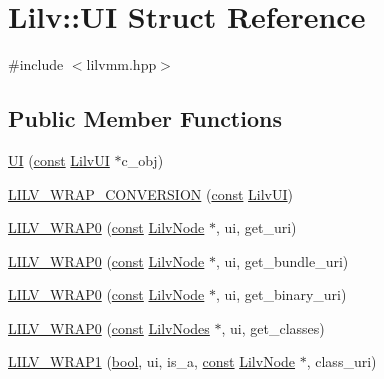 \hypertarget{struct_lilv_1_1_u_i}{}\section{Lilv\+:\+:UI Struct Reference}
\label{struct_lilv_1_1_u_i}


{\ttfamily \#include $<$lilvmm.\+hpp$>$}

\subsection*{Public Member Functions}
\begin{DoxyCompactItemize}
\item 
\hyperlink{struct_lilv_1_1_u_i_ad52e00fe47c440113b2fd5a8b11887aa}{UI} (\hyperlink{getopt1_8c_a2c212835823e3c54a8ab6d95c652660e}{const} \hyperlink{lilv_8h_a42d32f453a79ab1c944daa6436f22dde}{Lilv\+UI} $\ast$c\+\_\+obj)
\item 
\hyperlink{struct_lilv_1_1_u_i_a9a5ce875cb13a6f056c598b40f075cb8}{L\+I\+L\+V\+\_\+\+W\+R\+A\+P\+\_\+\+C\+O\+N\+V\+E\+R\+S\+I\+ON} (\hyperlink{getopt1_8c_a2c212835823e3c54a8ab6d95c652660e}{const} \hyperlink{lilv_8h_a42d32f453a79ab1c944daa6436f22dde}{Lilv\+UI})
\item 
\hyperlink{struct_lilv_1_1_u_i_a2447e863e3ed08a1f4e858b542fcc5d6}{L\+I\+L\+V\+\_\+\+W\+R\+A\+P0} (\hyperlink{getopt1_8c_a2c212835823e3c54a8ab6d95c652660e}{const} \hyperlink{lilv_8h_ae183dca3dca5368d34dbd863a405437b}{Lilv\+Node} $\ast$, ui, get\+\_\+uri)
\item 
\hyperlink{struct_lilv_1_1_u_i_a1482ca37df08c85de952f3f0aa1ab165}{L\+I\+L\+V\+\_\+\+W\+R\+A\+P0} (\hyperlink{getopt1_8c_a2c212835823e3c54a8ab6d95c652660e}{const} \hyperlink{lilv_8h_ae183dca3dca5368d34dbd863a405437b}{Lilv\+Node} $\ast$, ui, get\+\_\+bundle\+\_\+uri)
\item 
\hyperlink{struct_lilv_1_1_u_i_a7cc94ccd343041f3de1874c11a2951d0}{L\+I\+L\+V\+\_\+\+W\+R\+A\+P0} (\hyperlink{getopt1_8c_a2c212835823e3c54a8ab6d95c652660e}{const} \hyperlink{lilv_8h_ae183dca3dca5368d34dbd863a405437b}{Lilv\+Node} $\ast$, ui, get\+\_\+binary\+\_\+uri)
\item 
\hyperlink{struct_lilv_1_1_u_i_acb33c005aca29eab0d855a6ec74297ec}{L\+I\+L\+V\+\_\+\+W\+R\+A\+P0} (\hyperlink{getopt1_8c_a2c212835823e3c54a8ab6d95c652660e}{const} \hyperlink{lilv_8h_a256c2c4443307f320de24bb31198df83}{Lilv\+Nodes} $\ast$, ui, get\+\_\+classes)
\item 
\hyperlink{struct_lilv_1_1_u_i_ad93f9e940cbe952d2a75a88c78aac677}{L\+I\+L\+V\+\_\+\+W\+R\+A\+P1} (\hyperlink{mac_2config_2i386_2lib-src_2libsoxr_2soxr-config_8h_abb452686968e48b67397da5f97445f5b}{bool}, ui, is\+\_\+a, \hyperlink{getopt1_8c_a2c212835823e3c54a8ab6d95c652660e}{const} \hyperlink{lilv_8h_ae183dca3dca5368d34dbd863a405437b}{Lilv\+Node} $\ast$, class\+\_\+uri)
\end{DoxyCompactItemize}
